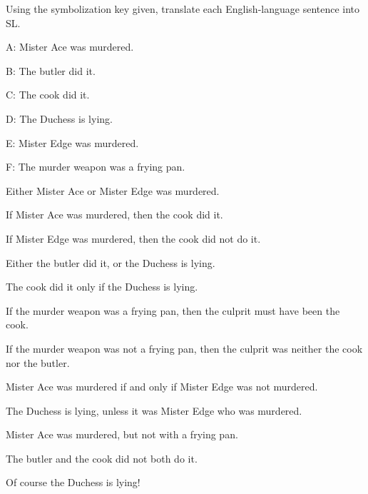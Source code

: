 
\noindent\problempart Using the symbolization key given, translate each English-language sentence into SL.
\begin{ekey}
\item[A:] Mister Ace was murdered.
\item[B:] The butler did it.
\item[C:] The cook did it.
\item[D:] The Duchess is lying.
\item[E:] Mister Edge was murdered.
\item[F:] The murder weapon was a frying pan.
\end{ekey}
\begin{exercises}
\item Either Mister Ace or Mister Edge was murdered. %
\item If Mister Ace was murdered, then the cook did it. %
\item If Mister Edge was murdered, then the cook did not do it. %
\item Either the butler did it, or the Duchess is lying. %
\item The cook did it only if the Duchess is lying. %
\item If the murder weapon was a frying pan, then the culprit must have been the cook. %
\item If the murder weapon was not a frying pan, then the culprit was neither the cook nor the butler. %
\item Mister Ace was murdered if and only if Mister Edge was not murdered. %
\item The Duchess is lying, unless it was Mister Edge who was murdered. %
\item Mister Ace was murdered, but not with a frying pan. %
\item The butler and the cook did not both do it. %
\item Of course the Duchess is lying! %
\end{exercises}

